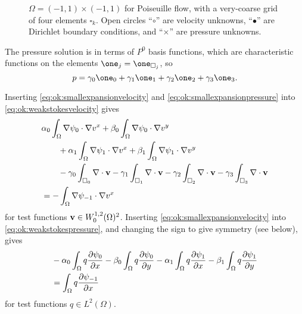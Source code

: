 \begin{figure}

\caption{$\Omega=(-1,1)\times(-1,1)$ for Poiseuille flow, with a very-coarse grid of four elements $\square_k$.  Open circles ``{\large $\circ$}'' are velocity unknowns, ``$\bullet$'' are Dirichlet boundary conditions, and ``$\times$'' are pressure unknowns.}
\label{fig:ok:poiseuilletinygrid}
\end{figure}

The pressure solution is in terms of $P^0$ basis functions, which are characteristic functions on the elements $\one_j = \one_{\square_j}$, so
\begin{equation}
p = \gamma_0 \one_0 + \gamma_1 \one_1 + \gamma_2 \one_2 + \gamma_3 \one_3.  \label{eq:ok:smallexpansionpressure}
\end{equation}

Inserting \eqref{eq:ok:smallexpansionvelocity} and \eqref{eq:ok:smallexpansionpressure} into \eqref{eq:ok:weakstokesvelocity} gives
\begin{align}
&\alpha_0 \int_\Omega \nabla \psi_0 \cdot \nabla v^x + \beta_0 \int_\Omega \nabla \psi_0 \cdot \nabla v^y \label{eq:ok:smallconcretevelocity} \\
&\qquad + \alpha_1 \int_\Omega \nabla \psi_1 \cdot \nabla v^x + \beta_1 \int_\Omega \nabla \psi_1 \cdot \nabla v^y \notag \\
&\qquad - \gamma_0 \int_{\square_0} \nabla\cdot \mathbf{v} - \gamma_1 \int_{\square_1} \nabla\cdot \mathbf{v} - \gamma_2 \int_{\square_2} \nabla\cdot \mathbf{v} - \gamma_3 \int_{\square_3} \nabla\cdot \mathbf{v} \notag \\
&= - \int_\Omega \nabla \psi_{-1} \cdot \nabla v^x \notag
\end{align}
for test functions $\mathbf{v} \in W_0^{1,2}(\Omega)^2$.  Inserting \eqref{eq:ok:smallexpansionvelocity} into \eqref{eq:ok:weakstokespressure}, and changing the sign to give symmetry (see below), gives
\begin{align}
&- \alpha_0 \int_\Omega q \frac{\partial \psi_0}{\partial x} - \beta_0 \int_\Omega q \frac{\partial \psi_0}{\partial y} - \alpha_1 \int_\Omega q \frac{\partial \psi_1}{\partial x} - \beta_1 \int_\Omega q \frac{\partial \psi_1}{\partial y}  \label{eq:ok:smallconcretepressure} \\
&= \int_\Omega q \frac{\partial \psi_{-1}}{\partial x} \notag
\end{align}
for test functions $q \in L^2(\Omega)$.


